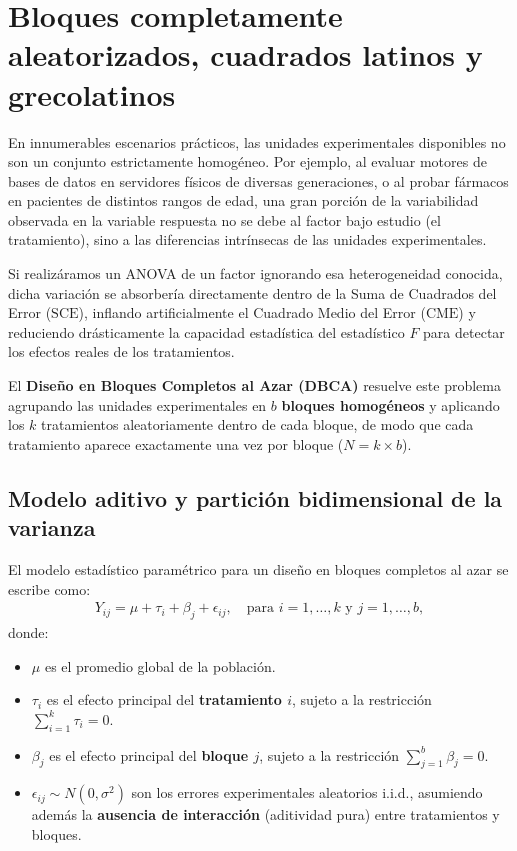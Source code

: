 \section{Bloques completamente aleatorizados, cuadrados latinos y grecolatinos}

En innumerables escenarios prácticos, las unidades experimentales disponibles no son un conjunto estrictamente homogéneo. Por ejemplo, al evaluar motores de bases de datos en servidores físicos de diversas generaciones, o al probar fármacos en pacientes de distintos rangos de edad, una gran porción de la variabilidad observada en la variable respuesta no se debe al factor bajo estudio (el tratamiento), sino a las diferencias intrínsecas de las unidades experimentales.

Si realizáramos un ANOVA de un factor ignorando esa heterogeneidad conocida, dicha variación se absorbería directamente dentro de la Suma de Cuadrados del Error ($\text{SCE}$), inflando artificialmente el Cuadrado Medio del Error ($\text{CME}$) y reduciendo drásticamente la capacidad estadística del estadístico $F$ para detectar los efectos reales de los tratamientos.

El \textbf{Diseño en Bloques Completos al Azar (DBCA)} resuelve este problema agrupando las unidades experimentales en $b$ \textbf{bloques homogéneos} y aplicando los $k$ tratamientos aleatoriamente dentro de cada bloque, de modo que cada tratamiento aparece exactamente una vez por bloque ($N = k \times b$).

\subsection{Modelo aditivo y partición bidimensional de la varianza}

El modelo estadístico paramétrico para un diseño en bloques completos al azar se escribe como:
\begin{align}
	Y_{ij} = \mu + \tau_i + \beta_j + \epsilon_{ij}, \quad \text{para } i = 1, \ldots, k \text{ y } j = 1, \ldots, b,
	\label{eq:modelo_dbca}
\end{align}
donde:
\begin{itemize}
	\item $\mu$ es el promedio global de la población.
	\item $\tau_i$ es el efecto principal del \textbf{tratamiento $i$}, sujeto a la restricción $\sum_{i=1}^k \tau_i = 0$.
	\item $\beta_j$ es el efecto principal del \textbf{bloque $j$}, sujeto a la restricción $\sum_{j=1}^b \beta_j = 0$.
	\item $\epsilon_{ij} \sim N(0, \sigma^2)$ son los errores experimentales aleatorios i.i.d., asumiendo además la \textbf{ausencia de interacción} (aditividad pura) entre tratamientos y bloques.
\end{itemize}


